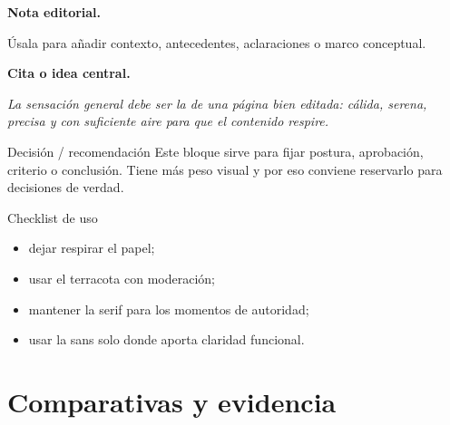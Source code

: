 \documentclass[11pt,a4paper]{article}
\begin{document}
\begin{tcbraster}[
  raster columns=2,
  raster equal height=rows,
  raster column skip=10pt,
  raster before skip=0pt,
  raster after skip=0pt
]
\begin{claudenote}
\textbf{\sffamily Nota editorial.}

Úsala para añadir contexto, antecedentes, aclaraciones o marco conceptual.
\end{claudenote}

\begin{claudequote}
\textbf{\sffamily Cita o idea central.}

\itshape
La sensación general debe ser la de una página bien editada: cálida, serena, precisa y con suficiente aire para que el contenido respire.
\end{claudequote}

\begin{claudedecision}{Decisión / recomendación}
Este bloque sirve para fijar postura, aprobación, criterio o conclusión. Tiene más peso visual y por eso conviene reservarlo para decisiones de verdad.
\end{claudedecision}

\begin{claudechecklist}{Checklist de uso}
\begin{itemize}
\item dejar respirar el papel;
\item usar el terracota con moderación;
\item mantener la serif para los momentos de autoridad;
\item usar la sans solo donde aporta claridad funcional.
\end{itemize}
\end{claudechecklist}
\end{tcbraster}

\section{Comparativas y evidencia}
\end{document}
